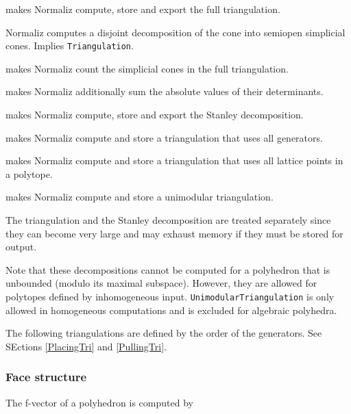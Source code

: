\begin{itemize}
	
	\itemtt[Triangulation, -T] makes Normaliz compute, store and export the full triangulation.
	
	\itemtt[ConeDecomposition, -D] Normaliz computes a disjoint decomposition of the cone into semiopen simplicial cones. Implies \verb|Triangulation|.
	
	\itemtt[TriangulationSize, -t] makes Normaliz count the simplicial cones in the full triangulation.
	
	\itemtt[TriangulationDetSum] makes Normaliz additionally sum the absolute values of their determinants.
	
	\itemtt[StanleyDec, -y] makes Normaliz compute, store and export the Stanley decomposition.
	
	\itemtt[AllGeneratorsTriangulation] makes Normaliz compute and store a triangulation that uses all generators.
	
	\itemtt[LatticePointTriangulation] makes Normaliz compute and store a triangulation that uses all lattice points in a polytope.
	
	\itemtt[UnimodularTriangulation] makes Normaliz compute and store a unimodular triangulation.
	
\end{itemize}

The triangulation and the Stanley decomposition are treated
separately since they can become very large and may exhaust
memory if they must be stored for output.

Note that these decompositions cannot be computed for a polyhedron that is unbounded (modulo its maximal subspace). However, they are allowed for polytopes defined by inhomogeneous input. \verb|UnimodularTriangulation| is only allowed in homogeneous computations and is excluded for algebraic polyhedra.

The following triangulations are defined by the order of the generators. See SEctions \ref{PlacingTri} and \ref{PullingTri}.
\begin{itemize}
	\itemtt[PlacingTriangulation]
	\itemtt[PullingTriangulation]
\end{itemize}

\subsubsection{Face structure}

The f-vector of a polyhedron is computed by
\begin{itemize}
	\itemtt[FVector]
\end{itemize}

